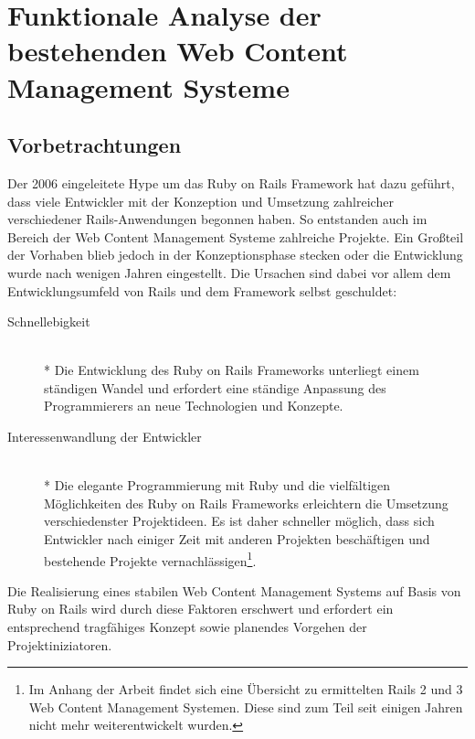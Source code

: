 \chapter{Funktionale Analyse der bestehenden Web Content Management Systeme}


\section{Vorbetrachtungen}
Der 2006 eingeleitete Hype um das Ruby on Rails Framework hat dazu geführt, dass viele Entwickler mit der Konzeption und Umsetzung zahlreicher verschiedener Rails-Anwendungen begonnen haben. So entstanden auch im Bereich der Web Content Management Systeme zahlreiche Projekte. Ein Großteil der Vorhaben blieb jedoch in der Konzeptionsphase stecken oder die Entwicklung wurde nach wenigen Jahren eingestellt. Die Ursachen sind dabei vor allem dem Entwicklungsumfeld von Rails und dem Framework selbst geschuldet:


\begin{description}
\item[Schnellebigkeit]\mbox{~}\\*
Die Entwicklung des Ruby on Rails Frameworks unterliegt einem ständigen Wandel und erfordert eine ständige Anpassung des Programmierers an neue Technologien und Konzepte.
\item[Interessenwandlung der Entwickler]\mbox{~}\\*
Die elegante Programmierung mit Ruby und die vielfältigen Möglichkeiten des Ruby on Rails Frameworks erleichtern die Umsetzung verschiedenster Projektideen.
Es ist daher schneller möglich, dass sich Entwickler nach einiger Zeit mit anderen Projekten beschäftigen und bestehende Projekte vernachlässigen\footnote{Im Anhang der Arbeit findet sich eine Übersicht zu ermittelten Rails 2 und 3 Web Content Management Systemen. Diese sind zum Teil seit einigen Jahren nicht mehr weiterentwickelt wurden.}.
\end{description}

Die Realisierung eines stabilen Web Content Management Systems auf Basis von Ruby on Rails wird durch diese Faktoren erschwert und erfordert ein entsprechend tragfähiges Konzept sowie planendes Vorgehen der Projektiniziatoren.

